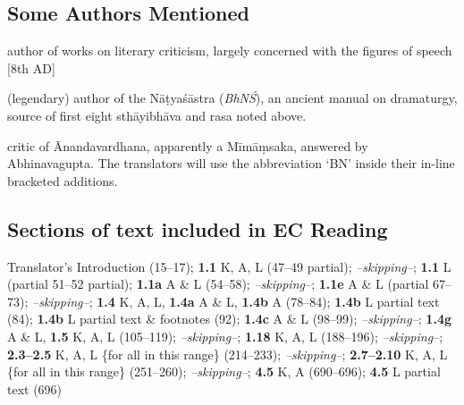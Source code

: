 \documentclass[10pt]{article}
\begin{document}
\subsection{Some Authors Mentioned}


\begin{description}
	\setlength{\itemsep}{-0.25em}

	\item[Bhāmaha] author of works on literary criticism, largely concerned with the figures of speech [8th AD]

	\item[Bharata] (legendary) author of the Nāṭyaśāstra (\textit{BhNŚ}), an ancient manual on dramaturgy, source of first eight sthāyibhāva and rasa noted above.

	\item[Bhaṭṭanāyaka] critic of Ānandavardhana, apparently a Mīmāṃsaka, answered by Abhinavagupta. The translators will use the abbreviation `BN' inside their in-line bracketed additions.

\end{description}

\subsection{Sections of text included in EC Reading}

Translator's Introduction (15--17);
\textbf{1.1} K, A, L (47--49 partial);
\textit{--skipping--};
\textbf{1.1} L (partial 51--52 partial);
\textbf{1.1a} A \& L (54--58);
\textit{--skipping--};
\textbf{1.1e} A \& L (partial 67--73);
\textit{--skipping--};
\textbf{1.4} K, A, L, 
\textbf{1.4a} A \& L, 
\textbf{1.4b} A (78--84);
\textbf{1.4b} L partial text (84);
\textbf{1.4b} L partial text \& footnotes (92);
\textbf{1.4c} A \& L (98--99);
\textit{--skipping--};
\textbf{1.4g} A \& L, 
\textbf{1.5} K, A, L (105--119);
\textit{--skipping--};
\textbf{1.18} K, A, L (188--196);
\textit{--skipping--};
\textbf{2.3--2.5} K, A, L \{for all in this range\} (214--233);
\textit{--skipping--};
\textbf{2.7--2.10} K, A, L \{for all in this range\} (251--260);
\textit{--skipping--};
\textbf{4.5} K, A (690--696);
\textbf{4.5} L partial text (696)
\end{document}
